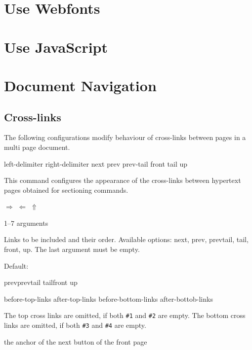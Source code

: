 \documentclass{book}
\begin{document}
\section{Use Webfonts}

\section{Use JavaScript}
\section{Document Navigation}

\subsection{Cross-links}

The following configurations modify behaviour of cross-links between pages in a multi page document.

 {left-delimiter} {right-delimiter} {next} {prev} {prev-tail} {front} {tail} {up}\EndDoc

This command configures the appearance of the cross-links between hypertext pages obtained for sectioning commands.

\begin{texsource}
   {}{}{$\scriptstyle\Rightarrow$}
   {$\scriptstyle\Leftarrow$}
   {}{}{}{$\scriptstyle\Uparrow$}
\end{texsource}

 {1--7 arguments}\EndDoc

  Links to be included and their order. Available
  options: next, prev, prevtail, tail, front, up.
  The last argument must be empty.

  Default:

\begin{texsource}
   {prev}{prevtail}
   {tail}{front}
   {up}{}
\end{texsource}

 {before-top-links} {after-top-links} {before-bottom-links} {after-bottob-links}\EndDoc

The top cross links are omitted, if both \verb|#1| and \verb|#2| are empty.
The bottom cross links are omitted, if both \verb|#3| and \verb|#4| are empty.

 {the anchor of the next button of the front page}\EndDoc
\end{document}

